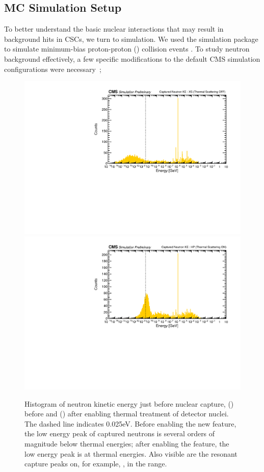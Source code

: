 \subsection{\GEANTfour MC Simulation Setup}
To better understand the basic nuclear interactions that may result in background hits in CSCs, we turn to simulation. We used the \GEANTfour simulation package to simulate minimum-bias proton-proton (\pp) collision events \cite{Agostinelli:2002hh,Allison:2006ve,Allison:2016lfl,Sjostrand:2006za}. To study neutron background effectively, a few specific modifications to the default CMS simulation configurations were necessary~\cite{PietsPage};

\begin{figure}[htbp]
	\centering
	\includegraphics[width=\dummyFigWidth]{figures/neutron/neutronSpectrum_before.pdf}\\
	\includegraphics[width=\dummyFigWidth]{figures/neutron/neutronSpectrum_after.pdf}
	\caption{Histogram of neutron kinetic energy just before nuclear capture, () before and () after enabling thermal treatment of detector nuclei. The dashed line indicates 0.025\unit{eV}. Before enabling the new feature, the low energy peak of captured neutrons is several orders of magnitude below thermal energies; after enabling the feature, the low energy peak is at thermal energies. Also visible are the resonant capture peaks on, for example, , in the \keVns range.}
	\label{fig:nKE}
\end{figure}


